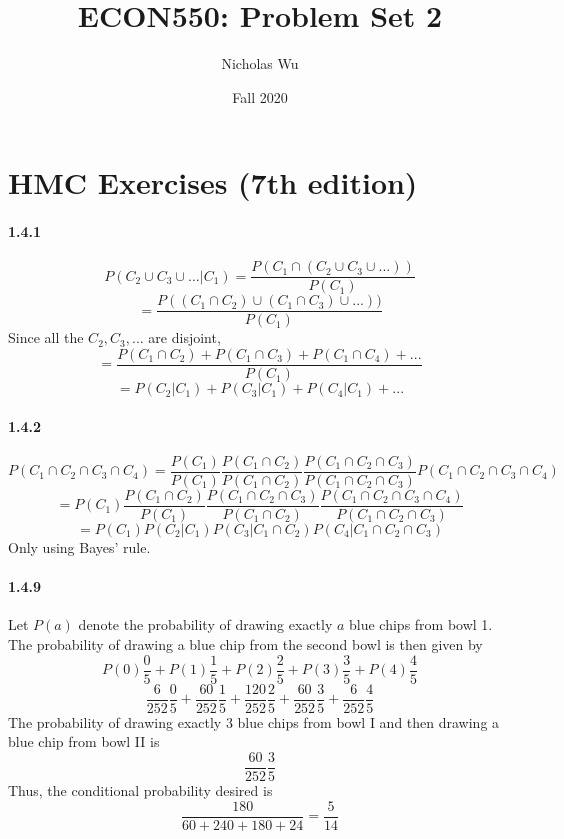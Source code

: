 \documentclass[10pt,letter]{article}
\begin{document}


\title{ECON550: Problem Set 2}

\author{Nicholas Wu}

\date{Fall 2020}

\maketitle
\section*{HMC Exercises (7th edition)}
\paragraph{1.4.1}
\[ P(C_2 \cup C_3 \cup ... | C_1) = \frac{P(C_1 \cap (C_2 \cup C_3 \cup ...))}{P(C_1)} \]
\[ = \frac{P((C_1 \cap C_2) \cup (C_1 \cap C_3) \cup ...))}{P(C_1)} \]
Since all the $C_2, C_3, ...$ are disjoint,
\[ = \frac{P(C_1 \cap C_2) + P(C_1 \cap C_3) + P(C_1 \cap C_4) + ...}{P(C_1)} \]
\[ = P(C_2 | C_1) + P(C_3 | C_1) + P(C_4 | C_1) + ... \]
\paragraph{1.4.2}
\[ P(C_1 \cap C_2 \cap C_3 \cap C_4) = \frac{P(C_1)}{P(C_1)}\frac{P(C_1 \cap C_2)}{P(C_1 \cap C_2)}\frac{P(C_1 \cap C_2\cap C_3)}{P(C_1 \cap C_2\cap C_3)}P(C_1 \cap C_2 \cap C_3 \cap C_4)\]
\[= P(C_1)\frac{P(C_1 \cap C_2)}{P(C_1)}\frac{P(C_1 \cap C_2\cap C_3)}{P(C_1 \cap C_2)}\frac{P(C_1 \cap C_2 \cap C_3 \cap C_4)}{P(C_1 \cap C_2\cap C_3)}\]
\[= P(C_1) P(C_2 | C_1) P(C_3 | C_1 \cap C_2) P(C_4 | C_1 \cap C_2 \cap C_3) \]
Only using Bayes' rule.
\paragraph{1.4.9}
Let $P(a)$ denote the probability of drawing exactly $a$ blue chips from bowl 1. The probability of drawing a blue chip from the second bowl is then given by
\[ P(0) \frac{0}{5} + P(1) \frac{1}{5} + P(2) \frac{2}{5} + P(3)\frac{3}{5} + P(4)\frac{4}{5} \]
\[ \frac{6}{252}\frac{0}{5} + \frac{60}{252}\frac{1}{5} + \frac{120}{252}\frac{2}{5} + \frac{60}{252}\frac{3}{5} +  \frac{6}{252}\frac{4}{5} \]
The probability of drawing exactly 3 blue chips from bowl I and then drawing a blue chip from bowl II is
\[ \frac{60}{252}\frac{3}{5} \]
Thus, the conditional probability desired is
\[ \frac{180}{60 + 240 + 180 +  24} = \frac{5}{14} \]
\end{document}
